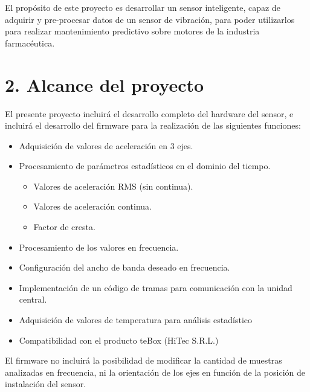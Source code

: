 \documentclass[11pt]{charter}
\begin{document}
El propósito de este proyecto es desarrollar un sensor inteligente, capaz de adquirir y pre-procesar datos de un sensor de vibración, para poder utilizarlos para realizar mantenimiento predictivo sobre motores de la industria farmacéutica.

\section{2. Alcance del proyecto}
\label{sec:alcance}

%
%
%
%

El presente proyecto incluirá el desarrollo completo del hardware del sensor, e incluirá el desarrollo del firmware para la realización de las siguientes funciones:

\begin{itemize}
\item Adquisición de valores de aceleración en 3 ejes.
\item Procesamiento de parámetros estadísticos en el dominio del tiempo.
	\begin{itemize}
	\item Valores de aceleración RMS (sin continua).
	\item Valores de aceleración continua.
	\item Factor de cresta.
	\end{itemize}
\item Procesamiento de los valores en frecuencia.
\item Configuración del ancho de banda deseado en frecuencia.
\item Implementación de un código de tramas para comunicación con la unidad central.
\item Adquisición de valores de temperatura para análisis estadístico
\item Compatibilidad con el producto teBox (HiTec S.R.L.)
\end{itemize}

El firmware no incluirá la posibilidad de modificar la cantidad de muestras analizadas en frecuencia, ni la orientación de los ejes en función de la posición de instalación del sensor.
\end{document}
